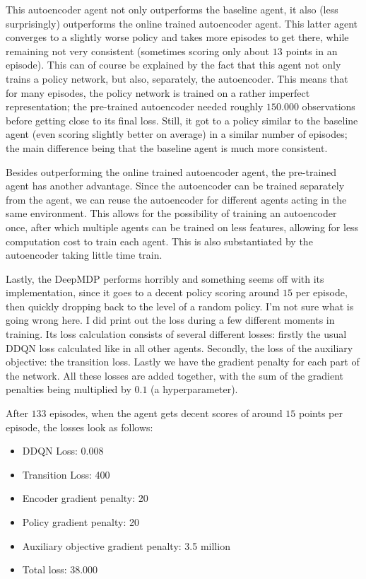 This autoencoder agent not only outperforms the baseline agent, it also (less surprisingly) outperforms the online trained autoencoder agent. This latter agent converges to a slightly worse policy and takes more episodes to get there, while remaining not very consistent (sometimes scoring only about $13$ points in an episode). This can of course be explained by the fact that this agent not only trains a policy network, but also, separately, the autoencoder. This means that for many episodes, the policy network is trained on a rather imperfect representation; the pre-trained autoencoder needed roughly $150.000$ observations before getting close to its final loss. Still, it got to a policy similar to the baseline agent (even scoring slightly better on average) in a similar number of episodes; the main difference being that the baseline agent is much more consistent. %

Besides outperforming the online trained autoencoder agent, the pre-trained agent has another advantage. Since the autoencoder can be trained separately from the agent, we can reuse the autoencoder for different agents acting in the same environment. This allows for the possibility of training an autoencoder once, after which multiple agents can be trained on less features, allowing for less computation cost to train each agent. This is also substantiated by the autoencoder taking little time train.

Lastly, the DeepMDP performs horribly and something seems off with its implementation, since it goes to a decent policy scoring around $15$ per episode, then quickly dropping back to the level of a random policy. I'm not sure what is going wrong here. I did print out the loss during a few different moments in training. Its loss calculation consists of several different losses: firstly the usual DDQN loss calculated like in all other agents. Secondly, the loss of the auxiliary objective: the transition loss. Lastly we have the gradient penalty for each part of the network. All these losses are added together, with the sum of the gradient penalties being multiplied by $0.1$ (a hyperparameter).

After $133$ episodes, when the agent gets decent scores of around $15$ points per episode, the losses look as follows:
\begin{itemize}
\item DDQN Loss: 0.008
\item Transition Loss: 400
\item Encoder gradient penalty: 20
\item Policy gradient penalty: 20
\item Auxiliary objective gradient penalty: 3.5 million
\item Total loss: 38.000
\end{itemize}

